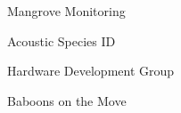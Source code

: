 \item Mangrove Monitoring
\item Acoustic Species ID
\item Hardware Development Group
\item Baboons on the Move
